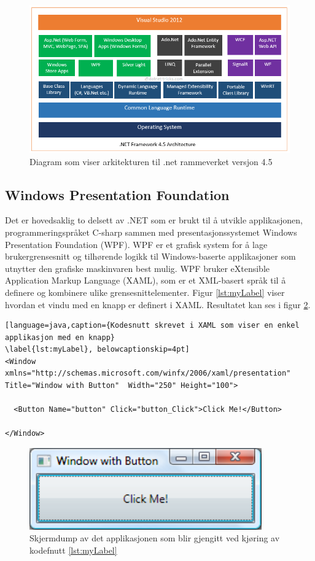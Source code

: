 \documentclass[phd,tocprelim]{cornell}
\begin{document}
\begin{figure}[ht]
\centering
\includegraphics[width=140mm]{netframework45}
\caption{Diagram som viser arkitekturen til .net rammeverket versjon 4.5}
\label{fig:net-arkitektur}
\end{figure}

\subsection{Windows Presentation Foundation}

Det er hovedsaklig to delsett av .NET som er brukt til å utvikle applikasjonen, programmeringspråket C-sharp sammen med presentasjonssystemet Windows Presentation Foundation (\gls{WPF}).  WPF er et grafisk system for å lage brukergrensesnitt og tilhørende logikk til Windows-baserte applikasjoner som utnytter den grafiske maskinvaren best mulig. WPF bruker eXtensible Application Markup Language (\gls{XAML}), som er et XML-basert språk til å definere og kombinere ulike grensesnittelementer. Figur \ref{lst:myLabel} viser hvordan et vindu med en knapp er definert i XAML. Resultatet kan ses i figur \ref{fig:xamlButton}. 

\begin{lstlisting}[language=java,caption={Kodesnutt skrevet i XAML som viser en enkel applikasjon med en knapp}
\label{lst:myLabel}, belowcaptionskip=4pt]
<Window xmlns="http://schemas.microsoft.com/winfx/2006/xaml/presentation" Title="Window with Button"  Width="250" Height="100">

  <Button Name="button" Click="button_Click">Click Me!</Button>
  
</Window>
\end{lstlisting}

\begin{figure}[ht!]
\centering
\includegraphics[width=100mm]{xamlButton}
\caption{Skjermdump av det applikasjonen som blir gjengitt ved kjøring av kodefnutt \ref{lst:myLabel}}
\label{fig:xamlButton}
\end{figure}
\end{document}
